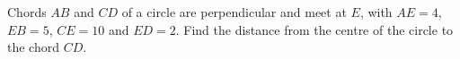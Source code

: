 Chords $AB$ and $CD$ of a circle are perpendicular and meet at $E$, with $AE=4$, $EB=5$, $CE=10$ and $ED=2$. Find the distance from the centre of the circle to the chord $CD$.
